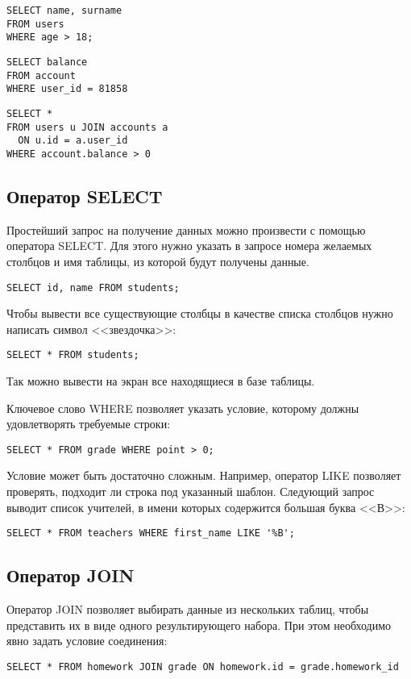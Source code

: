 \begin{verbatim}
SELECT name, surname
FROM users
WHERE age > 18;
\end{verbatim}

\begin{verbatim}
SELECT balance
FROM account
WHERE user_id = 81858
\end{verbatim}

\begin{verbatim}
SELECT *
FROM users u JOIN accounts a
  ON u.id = a.user_id
WHERE account.balance > 0
\end{verbatim}

\subsection{Оператор SELECT}
Простейший запрос на получение данных можно произвести с помощью оператора SELECT. Для этого нужно указать в запросе номера желаемых столбцов и имя таблицы, из которой будут получены данные.
\begin{verbatim}
SELECT id, name FROM students;
\end{verbatim}
Чтобы вывести все существующие столбцы в качестве списка столбцов нужно написать символ <<звездочка>>:
\begin{verbatim}
SELECT * FROM students;
\end{verbatim}
Так можно вывести на экран все находящиеся в базе таблицы.

Ключевое слово WHERE позволяет указать условие, которому должны удовлетворять требуемые строки:
\begin{verbatim}
SELECT * FROM grade WHERE point > 0;
\end{verbatim}
Условие может быть достаточно сложным. Например, оператор LIKE позволяет проверять, подходит ли строка под указанный шаблон. Следующий запрос выводит список учителей, в имени которых содержится большая буква <<В>>:
\begin{verbatim}
SELECT * FROM teachers WHERE first_name LIKE '%B';
\end{verbatim}

\subsection{Оператор JOIN}
Оператор JOIN позволяет выбирать данные из нескольких таблиц, чтобы представить их в виде одного результирующего набора. При этом необходимо явно задать условие соединения:
\begin{verbatim}
SELECT * FROM homework JOIN grade ON homework.id = grade.homework_id
\end{verbatim}

